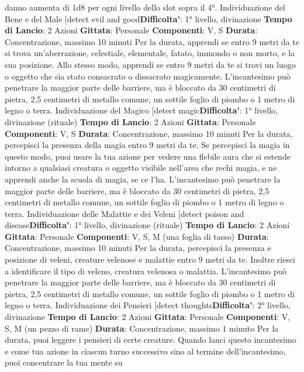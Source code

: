 \begin{multicols}{2}
danno aumenta di 1d8 per ogni livello dello slot sopra il
4°.
Individuazione del Bene e del Male
[detect evil and good\textbf{Difficolta'}:
1° livello, divinazione
\textbf{Tempo di Lancio}: 2 Azioni
\textbf{Gittata}: Personale
\textbf{Componenti}: V, S
\textbf{Durata}: Concentrazione, massimo 10 minuti
Per la durata, apprendi se entro 9 metri da te si trova
un’aberrazione, celestiale, elementale, fatato, immondo
o non morto, e la sua posizione. Allo stesso modo,
apprendi se entro 9 metri da te si trovi un luogo o
oggetto che sia stato consacrato o dissacrato
magicamente.
L’incantesimo può penetrare la maggior parte delle
barriere, ma è bloccato da 30 centimetri di pietra, 2,5
centimetri di metallo comune, un sottile foglio di piombo
o 1 metro di legno o terra.
Individuazione del Magico
[detect magic\textbf{Difficolta'}:
1° livello, divinazione (rituale)
\textbf{Tempo di Lancio}: 2 Azioni
\textbf{Gittata}: Personale
\textbf{Componenti}: V, S
\textbf{Durata}: Concentrazione, massimo 10 minuti
Per la durata, percepisci la presenza della magia entro
9 metri da te. Se percepisci la magia in questo modo,
puoi usare la tua azione per vedere una flebile aura che 
si estende intorno a qualsiasi creatura o oggetto visibile
nell’area che rechi magia, e ne apprendi anche la
scuola di magia, se ce l’ha.
L’incantesimo può penetrare la maggior parte delle
barriere, ma è bloccato da 30 centimetri di pietra, 2,5
centimetri di metallo comune, un sottile foglio di piombo
o 1 metro di legno o terra.
Individuazione delle Malattie e dei Veleni
[detect poison and disease\textbf{Difficolta'}:
1° livello, divinazione (rituale)
\textbf{Tempo di Lancio}: 2 Azioni
\textbf{Gittata}: Personale
\textbf{Componenti}: V, S, M (una foglia di tasso)
\textbf{Durata}: Concentrazione, massimo 10 minuti
Per la durata, percepisci la presenza e posizione di
veleni, creature velenose e malattie entro 9 metri da te.
Inoltre riesci a identificare il tipo di veleno, creatura
velenosa o malattia.
L’incantesimo può penetrare la maggior parte delle
barriere, ma è bloccato da 30 centimetri di pietra, 2,5
centimetri di metallo comune, un sottile foglio di piombo
o 1 metro di legno o terra.
Individuazione dei Pensieri
[detect thoughts\textbf{Difficolta'}:
2° livello, divinazione
\textbf{Tempo di Lancio}: 2 Azioni
\textbf{Gittata}: Personale
\textbf{Componenti}: V, S, M (un pezzo di rame)
\textbf{Durata}: Concentrazione, massimo 1 minuto
Per la durata, puoi leggere i pensieri di certe creature.
Quando lanci questo incantesimo e come tua azione in
ciascun turno successivo sino al termine
dell’incantesimo, puoi concentrare la tua mente su

\end{multicols}
